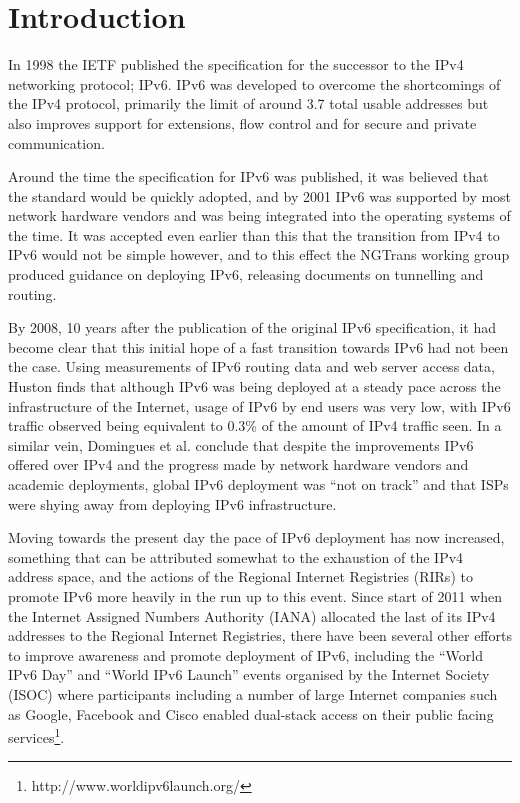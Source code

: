 \section{Introduction}

In 1998 the IETF published the specification for the successor to the IPv4
networking protocol; IPv6. IPv6 was developed to overcome the shortcomings
of the IPv4 protocol, primarily the limit of around 3.7 total usable
addresses\cite{beijnum_ip_2013} but also improves support for extensions, flow
control and for secure and private communication\cite{rfc2460}.

Around the time the specification for IPv6 was published, it was believed that
the standard would be quickly adopted, and by 2001 IPv6 was supported by most
network hardware vendors and was being integrated into the operating systems of
the time\cite{huang_ipv6_2000}\cite{durand_deploying_2001}. It was accepted even
earlier than this that
the transition from IPv4 to IPv6 would not be simple however, and to this effect
the NGTrans working group produced guidance on deploying IPv6, releasing
documents on tunnelling\cite{rfc1933}\cite{rfc2893} and routing\cite{rfc2185}. 

By 2008, 10 years after the publication of the original IPv6
specification, it had become clear that this initial hope of a fast
transition towards IPv6 had not been the case. Using measurements of IPv6 routing
data and web server access data, Huston finds that although IPv6 was being
deployed at a steady pace across the infrastructure of the Internet, usage of
IPv6 by end users was very low, with IPv6 traffic observed being equivalent to
0.3\% of the amount of IPv4 traffic seen\cite{huston_ipv6_2008}. In a similar vein, Domingues 
et al. conclude that despite the improvements IPv6 offered over IPv4
and the progress made by network hardware vendors and academic deployments,
global IPv6 deployment was ``not on track'' and that ISPs were shying away from
deploying IPv6 infrastructure\cite{domingues_is_2007}.

Moving towards the present day the pace of IPv6 deployment has now increased,
something that can be attributed somewhat to the exhaustion of the IPv4 address
space, and the actions of the Regional Internet Registries (RIRs) to promote IPv6 more heavily in the run up to
this event. Since start of 2011 when the Internet Assigned Numbers Authority (IANA)
allocated the last of its IPv4 addresses to the Regional Internet
Registries\cite{number_resource_organisation_free_2011},
there have been several other efforts to improve awareness and promote
deployment of IPv6, including the ``World IPv6 Day'' and ``World IPv6 Launch''
events organised by the Internet Society (ISOC) where participants including a
number of large Internet companies such as Google, Facebook and Cisco enabled
dual-stack access on their public facing services\footnote[1]{http://www.worldipv6launch.org/}.

